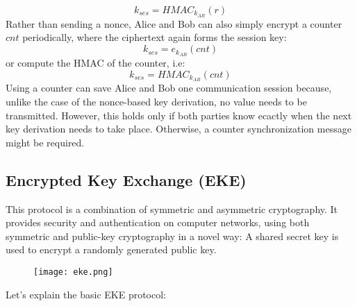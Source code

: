 \documentclass{article}
\begin{document}
\begin{equation*}
    k_{ses} = HMAC_{k_{AB}}(r)
\end{equation*}
Rather than sending a nonce, Alice and Bob can also simply encrypt a counter $cnt$ periodically, where the ciphertext again forms the session key:
\begin{equation*}
    k_{ses} = e_{k_{AB}}(cnt)
\end{equation*}
or compute the HMAC of the counter, i.e:
\begin{equation*}
    k_{ses} = HMAC_{k_{AB}}(cnt)
\end{equation*}
Using a counter can save Alice and Bob one communication session because, unlike the case of the nonce-based key derivation, no value needs to be transmitted. However, this holds only if both parties know ecactly when the next key derivation needs to take place. Otherwise, a counter synchronization message might be required.
\subsection{Encrypted Key Exchange (EKE)}
This protocol is a combination of symmetric and asymmetric cryptography. It provides security and authentication on computer
networks, using both symmetric and public-key cryptography in a novel way:
A shared secret key is used to encrypt a randomly generated public key.
\begin{figure} [H]
    \centering
    \texttt{[image: eke.png]}
\end{figure}
Let's explain the basic EKE protocol:
\end{document}
